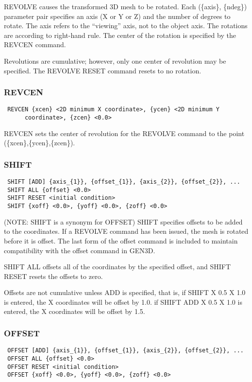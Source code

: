 REVOLVE causes the transformed 3D mesh to be rotated.  Each (\{axis\},
\{ndeg\}) parameter pair specifies an axis (X or Y or Z) and the number of
degrees to rotate.  The axis refers to the ``viewing'' axis, not to the
object axis.  The rotations are according to right-hand rule.  The
center of the rotation is specified by the REVCEN command.

Revolutions are cumulative; however, only one center of revolution may
be specified.  The REVOLVE RESET command resets to no rotation.
\subsubsection{REVCEN}
\begin{verbatim}
 REVCEN {xcen} <2D minimum X coordinate>, {ycen} <2D minimum Y
      coordinate>, {zcen} <0.0>
\end{verbatim}

REVCEN sets the center of revolution for the REVOLVE command to the
point (\{xcen\},\{ycen\},\{zcen\}).
\subsubsection{SHIFT}
\begin{verbatim}
 SHIFT [ADD] {axis_{1}}, {offset_{1}}, {axis_{2}}, {offset_{2}}, ...
 SHIFT ALL {offset} <0.0>
 SHIFT RESET <initial condition>
 SHIFT {xoff} <0.0>, {yoff} <0.0>, {zoff} <0.0>
\end{verbatim}

(NOTE: SHIFT is a synonym for OFFSET)
SHIFT specifies offsets to be added to the coordinates.  If a REVOLVE
command has been issued, the mesh is rotated before it is offset.  The
last form of the offset command is included to maintain compatibility
with the offset command in GEN3D.

SHIFT ALL offsets all of the coordinates by the specified offset, and
SHIFT RESET resets the offsets to zero.

Offsets are not cumulative unless ADD is specified, that is,
if SHIFT X 0.5 X 1.0 is entered, the X coordinates will be offset by 1.0.
if SHIFT ADD X 0.5 X 1.0 is entered, the X coordinates will be offset by 1.5.
\subsubsection{OFFSET}
\begin{verbatim}
 OFFSET [ADD] {axis_{1}}, {offset_{1}}, {axis_{2}}, {offset_{2}}, ...
 OFFSET ALL {offset} <0.0>
 OFFSET RESET <initial condition>
 OFFSET {xoff} <0.0>, {yoff} <0.0>, {zoff} <0.0>
\end{verbatim}

